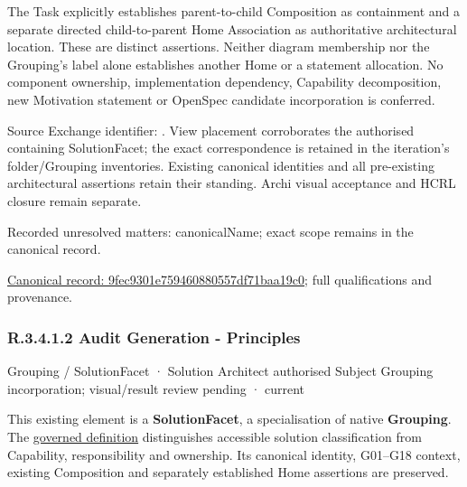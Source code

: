 The Task explicitly establishes parent-to-child Composition as containment and
a separate directed child-to-parent Home Association as authoritative architectural
location. These are distinct assertions. Neither diagram membership nor the
Grouping's label alone establishes another Home or a statement allocation.
No component ownership, implementation dependency, Capability decomposition,
new Motivation statement or OpenSpec candidate incorporation is conferred.



Source Exchange identifier: \texttt{}. View placement corroborates
the authorised containing SolutionFacet; the exact correspondence is retained in the
iteration's folder/Grouping inventories. Existing canonical identities and all
pre-existing architectural assertions retain their standing. Archi visual
acceptance and HCRL closure remain separate.


{\small Recorded unresolved matters: canonicalName; exact scope remains in the canonical record.}\par
{\footnotesize \href{../../../../../../../continuum/grouping/9fec9301e759460880557df71baa19c0.md}{Canonical record: 9fec9301e759460880557df71baa19c0}; full qualifications and provenance.}\par
\subsubsection*{R.3.4.1.2 Audit Generation - Principles}
\label{navigation:R.3.4.1.2}

\label{element:d56a556f29ff4ba78634e58d103c786e}
{\small Grouping / SolutionFacet · Solution Architect authorised Subject Grouping incorporation; visual/result review pending · current}\par

This existing element is a \textbf{SolutionFacet}, a specialisation of native
\textbf{Grouping}. The \href{\detokenize{../../../../../../../governance/continuum-representation.md#solutionfacet-classification--1119-candidate}}{governed definition}
distinguishes accessible solution classification from Capability, responsibility
and ownership. Its canonical identity, G01–G18 context, existing Composition
and separately established Home assertions are preserved.



